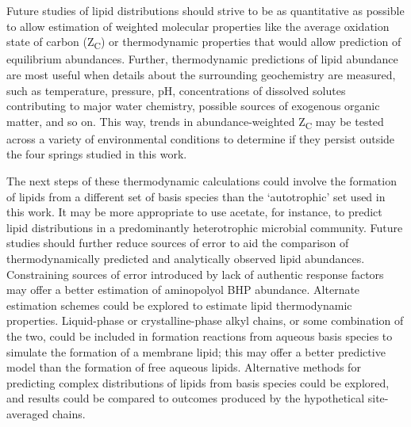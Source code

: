 Future studies of lipid distributions should strive to be as quantitative as possible to allow estimation of weighted molecular properties like the average oxidation state of carbon (Z\textsubscript{C}) or thermodynamic properties that would allow prediction of equilibrium abundances. Further, thermodynamic predictions of lipid abundance are most useful when details about the surrounding geochemistry are measured, such as temperature, pressure, pH, concentrations of dissolved solutes contributing to major water chemistry, possible sources of exogenous organic matter, and so on. This way, trends in abundance-weighted Z\textsubscript{C} may be tested across a variety of environmental conditions to determine if they persist outside the four springs studied in this work.

The next steps of these thermodynamic calculations could involve the formation of lipids from a different set of basis species than the `autotrophic' set used in this work. It may be more appropriate to use acetate, for instance, to predict lipid distributions in a predominantly heterotrophic microbial community. Future studies should further reduce sources of error to aid the comparison of thermodynamically predicted and analytically observed lipid abundances. Constraining sources of error introduced by lack of authentic response factors may offer a better estimation of aminopolyol BHP abundance. Alternate estimation schemes could be explored to estimate lipid thermodynamic properties. Liquid-phase or crystalline-phase alkyl chains, or some combination of the two, could be included in formation reactions from aqueous basis species to simulate the formation of a membrane lipid; this may offer a better predictive model than the formation of free aqueous lipids. Alternative methods for predicting complex distributions of lipids from basis species could be explored, and results could be compared to outcomes produced by the hypothetical site-averaged chains.




